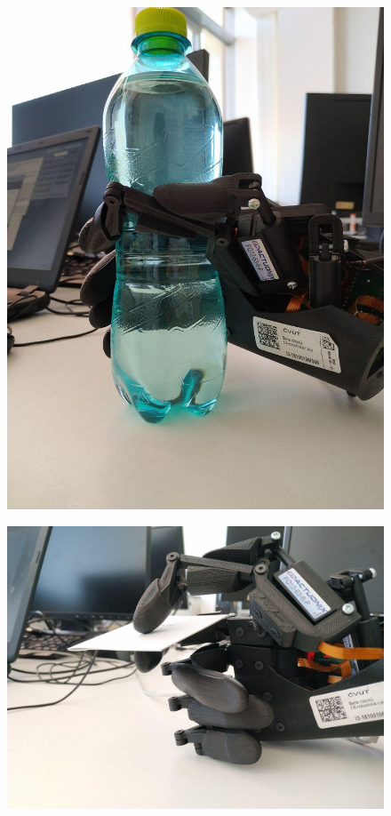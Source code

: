 \documentclass[thesis=B,czech]{FITthesis}[2012/06/26]
\begin{document}
 \begin{figure}[H]
\centering
\includegraphics[scale=0.3]{./image/testF2.jpg}
\end{figure} 

 \begin{figure}[H]
\centering
\includegraphics[scale=0.3]{./image/testF3.jpg}
\end{figure} 
\end{document}

